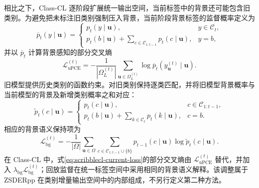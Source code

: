 相比之下，Class-CL 逐阶段扩展统一输出空间，当前标签中的背景还可能包含旧类别。为避免把未标注旧类别强制压入背景，当前阶段背景标签的监督概率定义为\cite{cermelli2020mib}
\begin{equation}
\overline{p}_{t}(y\mid\mathbf{u})
=
\begin{cases}
p_t(y\mid\mathbf{u}), & y\in\mathcal{C}_t,\\[1mm]
p_t(b\mid\mathbf{u})+
\displaystyle\sum_{c\in\mathcal{C}_{1:t-1}}p_t(c\mid\mathbf{u}), & y=b,
\end{cases}
\label{eq:scribblecl-background-aware-probability}
\end{equation}
并以 $\overline p_t$ 计算背景感知的部分交叉熵
\begin{equation}
\mathcal{L}_{\mathrm{uPCE}}^{(t)}
=
-\frac{1}{|\Omega_L^{(t)}|}
\sum_{\mathbf{u}\in\Omega_L^{(t)}}
\log \overline p_t\!\left(y_{\mathbf{u}}^{(t)}\mid\mathbf{u}\right).
\label{eq:scribblecl-background-aware-pce}
\end{equation}
旧模型提供历史类别的函数约束。对旧类别保持逐类匹配，并将旧模型背景概率与当前模型的背景及新增类别概率之和对应：
\begin{equation}
\widetilde p_t(c\mid\mathbf{u})
=
\begin{cases}
p_t(c\mid\mathbf{u}), & c\in\mathcal{C}_{1:t-1},\\[1mm]
p_t(b\mid\mathbf{u})+
\displaystyle\sum_{k\in\mathcal{C}_t}p_t(k\mid\mathbf{u}), & c=b.
\end{cases}
\label{eq:scribblecl-background-aware-distillation-probability}
\end{equation}
相应的背景语义保持项为
\begin{equation}
\mathcal{L}_{\mathrm{bg}}^{(t)}
=
-\frac{1}{|\Omega|}
\sum_{\mathbf{u}\in\Omega}
\sum_{c\in\mathcal{C}_{1:t-1}\cup\{b\}}
p_{t-1}(c\mid\mathbf{u})
\log \widetilde p_t(c\mid\mathbf{u}).
\label{eq:scribblecl-background-aware-distillation}
\end{equation}
在 Class-CL 中，式\eqref{eq:scribblecl-current-loss}的部分交叉熵由 $\mathcal{L}_{\mathrm{uPCE}}^{(t)}$ 替代，并加入 $\lambda_{\mathrm{bg}}\mathcal{L}_{\mathrm{bg}}^{(t)}$；回放监督在统一标签空间中采用相同的背景语义解释。该调整属于 ZSDERpp 在类别增量输出空间中的内部组成，不另行定义第二种方法。

